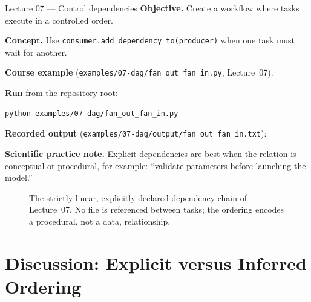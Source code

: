 \begin{lessonbox}{Lecture 07 --- Control dependencies}
\textbf{Objective.} Create a workflow where tasks execute in a controlled
order.

\textbf{Concept.} Use \texttt{consumer.add\_dependency\_to(producer)} when one
task must wait for another.

\textbf{Course example} (\texttt{examples/07-dag/fan\_out\_fan\_in.py}, Lecture~07).


\textbf{Run} from the repository root:
\begin{lstlisting}[style=bash]
python examples/07-dag/fan_out_fan_in.py
\end{lstlisting}

\textbf{Recorded output} (\texttt{examples/07-dag/output/fan\_out\_fan\_in.txt}):


\textbf{Scientific practice note.} Explicit dependencies are best when the
relation is conceptual or procedural, for example: ``validate parameters
before launching the model.''
\end{lessonbox}

\begin{figure}[h]
\centering
{}
\caption{The strictly linear, explicitly-declared dependency chain of
Lecture~07. No file is referenced between tasks; the ordering encodes a
procedural, not a data, relationship.}
\label{fig:lesson02-chain}
\end{figure}

\section{Discussion: Explicit versus Inferred Ordering}

